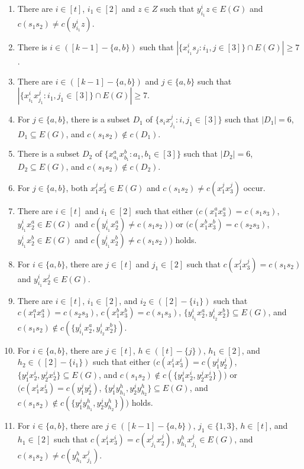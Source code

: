 \documentclass[12pt]{article}
\begin{document}
\begin{enumerate}
  \item There are $i\in[t]$, $i_1\in[2]$ and $z\in Z$ such that $y^i_{i_1}z\in E(G)$ and $c(s_1s_2)\neq c(y^i_{i_1}z)$.
  \item There is $i\in([k-1]-\{a,b\})$ such that $|\{x^i_{i_1}s_j:i_1,j\in[3]\}\cap E(G)|\geq7$.
  \item There are $i\in([k-1]-\{a,b\})$ and $j\in\{a,b\}$ such that $|\{x^i_{i_1}x^j_{j_1}:i_1,j_1\in[3]\}\cap E(G)|\geq7$.
  \item For $j\in\{a,b\}$, there is a subset $D_1$ of $\{s_ix^j_{j_1}:i,j_1\in[3]\}$ such that $|D_1|=6$, $D_1\subseteq E(G)$, and $c(s_1s_2)\not\in c(D_1)$.
  \item There is a subset $D_2$ of $\{x^a_{a_1}x^b_{b_1}:a_1,b_1\in[3]\}$ such that $|D_2|=6$, $D_2\subseteq E(G)$, and $c(s_1s_2)\not\in c(D_2)$.
  \item For \( j \in \{ a, b \} \), both \( x^j_1 x^j_3 \in E(G) \) and \( c(s_1 s_2) \neq c(x^j_1 x^j_3) \) occur.
   \item There are $i\in[t]$ and $i_1\in[2]$ such that either $\big(c(x^a_1x^a_3)=c(s_1s_3)$, $y^i_{i_1}x^a_2\in E(G)$ and $c(y^i_{i_1}x^a_2)\neq c(s_1s_2)\big)$ or $\big(c(x^b_1x^b_3)=c(s_2s_3)$, $y^i_{i_1}x^b_2\in E(G)$ and $c(y^i_{i_1}x^b_2)\neq c(s_1s_2)\big)$ holds.
 \item For $i\in\{a,b\}$, there are $j\in[t]$ and $j_1\in[2]$ such that $c(x^j_1x^j_3)=c(s_1s_2)$ and $y^i_{i_1}x^j_2\in E(G)$.
 \item There are $i\in[t]$, $i_1\in[2]$, and $i_2\in([2]-\{i_1\})$ such that $c(x^a_1x^a_3)=c(s_2s_3)$, $c(x^b_1x^b_3)=c(s_1s_3)$, $\{y^i_{i_1}x^a_2,y^i_{i_2}x^b_2\}\subseteq E(G)$, and $c(s_1s_2)\not\in c(\{y^i_{i_1}x^a_2,y^i_{i_2}x^b_2\})$.
 \item For $i\in\{a,b\}$, there are $j\in[t]$, $h\in([t]-\{j\})$, $h_1\in[2]$, and $h_2\in([2]-\{i_1\})$ such that either $\big(c(x^i_1x^i_3)=c(y^j_1y^j_2)$, $\{y^j_1x^i_2,y^j_2x^i_2\}\subseteq E(G)$, and $c(s_1s_2)\not\in c(\{y^j_1x^i_2,y^j_2x^i_2\})\big)$ or $\big(c(x^i_1x^i_3)=c(y^j_1y^j_2)$, $\{y^j_1y^h_{h_1},y^j_2y^h_{h_2}\}\subseteq E(G)$, and $c(s_1s_2)\not\in c(\{y^j_1y^h_{h_1},y^j_2y^h_{h_2}\})\big)$ holds. 
 \item For $i\in\{a,b\}$, there are $j\in([k-1]-\{a,b\})$, $j_1\in\{1,3\}$, $h\in[t]$, and $h_1\in[2]$ such that $c(x^i_1x^i_3)=c(x^j_{j_1}x^j_2)$, $y^h_{h_1}x^j_{j_1}\in E(G)$, and $c(s_1s_2)\neq c(y^h_{h_1}x^j_{j_1})$.
\end{enumerate}
\end{document}
